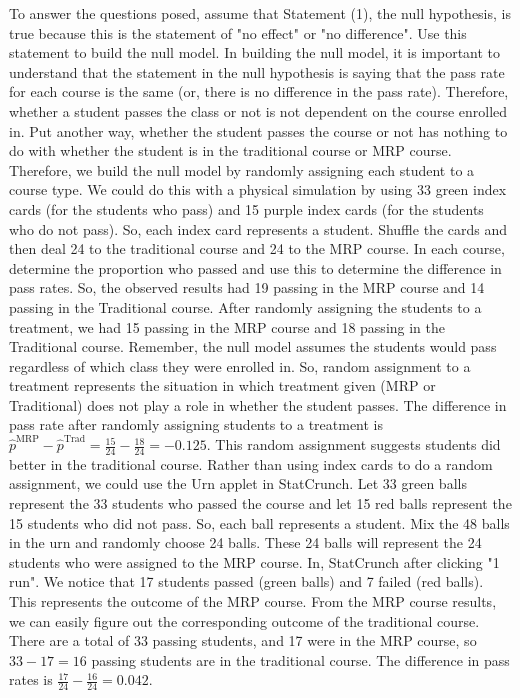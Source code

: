 \documentclass{report}
\begin{document}
    To answer the questions posed, assume that Statement (1), the null hypothesis, is true because this is the statement of "no effect" or "no difference". Use this statement to build the null model. In building the null model, it is important to understand that the statement in the null hypothesis is saying that the pass rate for each course is the same (or, there is no difference in the pass rate). Therefore, whether a student passes the class or not is not dependent on the course enrolled in. Put another way, whether the student passes the course or not has nothing to do with whether the student is in the traditional course or MRP course. Therefore, we build the null model by randomly assigning each student to a course type. We could do this with a physical simulation by using 33 green index cards (for the students who pass) and 15 purple index cards (for the students who do not pass). So, each index card represents a student. Shuffle the cards and then deal 24 to the traditional course and 24 to the MRP course. In each course, determine the proportion who passed and use this to determine the difference in pass rates. 
    \bigbreak \noindent 
    So, the observed results had 19 passing in the MRP course and 14 passing in the Traditional course. After randomly assigning the students to a treatment, we had 15 passing in the MRP course and 18 passing in the Traditional course. Remember, the null model assumes the students would pass regardless of which class they were enrolled in. So, random assignment to a treatment represents the situation in which treatment given (MRP or Traditional) does not play a role in whether the student passes. The difference in pass rate after randomly assigning students to a treatment is $\hat{p}^{\text{MRP}} - \hat{p}^{\text{Trad}} = \frac{15}{24} - \frac{18}{24} = -0.125$. This random assignment suggests students did better in the traditional course.
    \bigbreak \noindent 
    Rather than using index cards to do a random assignment, we could use the Urn applet in StatCrunch. Let 33 green balls represent the 33 students who passed the course and let 15 red balls represent the 15 students who did not pass. So, each ball represents a student. Mix the 48 balls in the urn and randomly choose 24 balls. These 24 balls will represent the 24 students who were assigned to the MRP course. 
    \bigbreak \noindent 
    In, StatCrunch after clicking "1 run". We notice that 17 students passed (green balls) and 7 failed (red balls). This represents the outcome of the MRP course. From the MRP course results, we can easily figure out the corresponding outcome of the traditional course. There are a total of 33 passing students, and 17 were in the MRP course, so $33 - 17 = 16$ passing students are in the traditional course. The difference in pass rates is $\frac{17}{24} - \frac{16}{24} = 0.042$.
\end{document}
